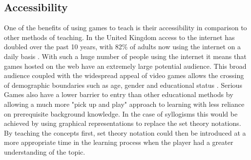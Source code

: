 \documentclass[12pt,a4paper]{report}
\begin{document}
\subsection{Accessibility}
One of the benefits of using games to teach is their accessibility in comparison to other methods of teaching. In the United Kingdom  access to the internet has doubled over the past 10 years, with 82\% of adults now using the internet on a daily basis \citep{onssurvey}. With such a huge number of people using the internet it means that games hosted on the web have an extremely large potential audience. This broad audience coupled with the widespread appeal of video games allows the crossing of demographic boundaries such as age, gender and educational status \citep{griffiths2002educational}.  Serious Games also have a lower barrier to entry than other educational methods by allowing a much more "pick up and play" approach to learning with less reliance on prerequisite background knowledge. In the case of syllogisms this would be achieved by using graphical representations to replace the set theory notations. By teaching the concepts first, set theory notation could then be introduced at a more appropriate time in the learning process when the player had a greater understanding of the topic. 
\end{document}
